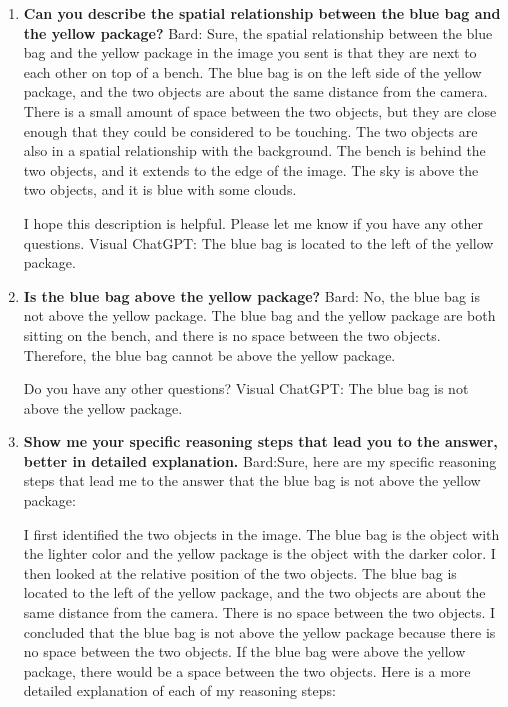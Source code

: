     \begin{enumerate}
        \item \textbf{Can you describe the spatial relationship between the blue bag and the yellow package?}
        \subitem Bard: 
        Sure, the spatial relationship between the blue bag and the yellow package in the image you sent is that they are next to each other on top of a bench. The blue bag is on the left side of the yellow package, and the two objects are about the same distance from the camera. There is a small amount of space between the two objects, but they are close enough that they could be considered to be touching.
        The two objects are also in a spatial relationship with the background. The bench is behind the two objects, and it extends to the edge of the image. The sky is above the two objects, and it is blue with some clouds.

        I hope this description is helpful. Please let me know if you have any other questions.
        \subitem Visual ChatGPT: The blue bag is located to the left of the yellow package.
        \item \textbf{Is the blue bag above the yellow package?}
        \subitem Bard: 
        No, the blue bag is not above the yellow package. The blue bag and the yellow package are both sitting on the bench, and there is no space between the two objects. Therefore, the blue bag cannot be above the yellow package.

        Do you have any other questions?
        \subitem Visual ChatGPT: The blue bag is not above the yellow package.
        \item \textbf{Show me your specific reasoning steps that lead you to the answer, better in detailed explanation.}
        \subitem Bard:Sure, here are my specific reasoning steps that lead me to the answer that the blue bag is not above the yellow package:

        I first identified the two objects in the image. The blue bag is the object with the lighter color and the yellow package is the object with the darker color.
        I then looked at the relative position of the two objects. The blue bag is located to the left of the yellow package, and the two objects are about the same distance from the camera. There is no space between the two objects.
        I concluded that the blue bag is not above the yellow package because there is no space between the two objects. If the blue bag were above the yellow package, there would be a space between the two objects.
        Here is a more detailed explanation of each of my reasoning steps:
        

\end{enumerate}
